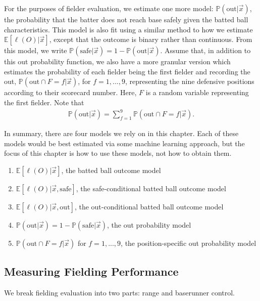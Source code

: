 \documentclass{article}
\begin{document}
  For the purposes of fielder evaluation, we estimate one more model: $\mathbb{P}(\mbox{out} | \vec x)$, the probability that the batter does not reach base safely given the batted ball characteristics. This model is also fit using a similar method to how we estimate $\mathbb{E}[\ell(O) | \vec x]$, except that the outcome is binary rather than continuous. From this model, we write $\mathbb{P}(\mbox{safe} | \vec x) = 1 - \mathbb{P}(\mbox{out} | \vec x)$. Assume that, in addition to this out probability function, we also have a more granular version which estimates the probability of each fielder being the first fielder and recording the out, $\mathbb{P}(\mbox{out} \cap F = f| \vec x)$, for $f = 1, ..., 9$, representing the nine defensive positions according to their scorecard number. Here, $F$ is a random variable representing the first fielder. Note that
  \begin{align}
    \label{eqn:out-prob-sum}
    \mathbb{P}(\mbox{out} | \vec x) = \sum_{f = 1}^9 \mathbb{P}(\mbox{out} \cap F = f | \vec x).
  \end{align}

  In summary, there are four models we rely on in this chapter. Each of these models would be best estimated via some machine learning approach, but the focus of this chapter is how to use these models, not how to obtain them.

  \begin{enumerate}
    \item $\mathbb{E}[\ell(O) | \vec x]$, the batted ball outcome model
    \item $\mathbb{E}[\ell(O) | \vec x, \mbox{safe}]$, the safe-conditional batted ball outcome model
    \item $\mathbb{E}[\ell(O) | \vec x, \mbox{out}]$, the out-conditional batted ball outcome model
    \item $\mathbb{P}(\mbox{out} | \vec x) = 1 - \mathbb{P}(\mbox{safe} | \vec x)$, the out probability model
    \item $\mathbb{P}(\mbox{out} \cap F = f | \vec x)$ for $f = 1, ..., 9$, the position-specific out probability model
  \end{enumerate}

  \subsection{\sc Measuring Fielding Performance}

    We break fielding evaluation into two parts: range and baserunner control.
\end{document}
